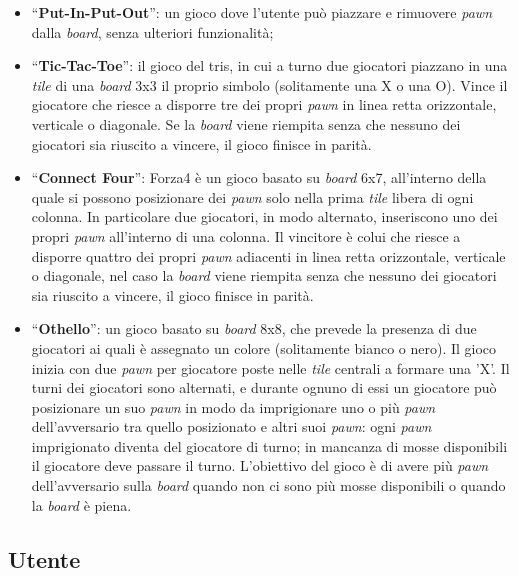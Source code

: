 \begin{itemize}
    \item ``\textbf{Put-In-Put-Out}'': un gioco dove l'utente può piazzare e rimuovere \textit{pawn} dalla \textit{board}, senza ulteriori funzionalità;
    \item ``\textbf{Tic-Tac-Toe}'': il gioco del tris, in cui a turno due giocatori piazzano in una \textit{tile} di una \textit{board} 3x3 il proprio simbolo (solitamente una X o una O). Vince il giocatore che riesce a disporre tre dei propri \textit{pawn} in linea retta orizzontale, verticale o diagonale. Se la \textit{board} viene riempita senza che nessuno dei giocatori sia riuscito a vincere, il gioco finisce in parità.
    \item ``\textbf{Connect Four}'': Forza4 è un gioco basato su \textit{board} 6x7, all'interno della quale si possono posizionare dei \textit{pawn} solo nella prima \textit{tile} libera di ogni colonna. In particolare due giocatori, in modo alternato, inseriscono uno dei propri \textit{pawn} all'interno di una colonna. Il vincitore è colui che riesce a disporre quattro dei propri \textit{pawn} adiacenti in linea retta orizzontale, verticale o diagonale, nel caso la \textit{board} viene riempita senza che nessuno dei giocatori sia riuscito a vincere, il gioco finisce in parità.
    \item ``\textbf{Othello}'': un gioco basato su \textit{board} 8x8, che prevede la presenza di due giocatori ai quali è assegnato un colore (solitamente bianco o nero). Il gioco inizia con due \textit{pawn} per giocatore poste nelle \textit{tile} centrali a formare una 'X'. Il turni dei giocatori sono alternati, e durante ognuno di essi un giocatore può posizionare un suo \textit{pawn} in modo da imprigionare uno o più \textit{pawn} dell'avversario tra quello posizionato e altri suoi \textit{pawn}: ogni \textit{pawn} imprigionato diventa del giocatore di turno; in mancanza di mosse disponibili il giocatore deve passare il turno. L'obiettivo del gioco è di avere più \textit{pawn} dell'avversario sulla \textit{board} quando non ci sono più mosse disponibili o quando la \textit{board} è piena.
\end{itemize}

\subsection{Utente}

